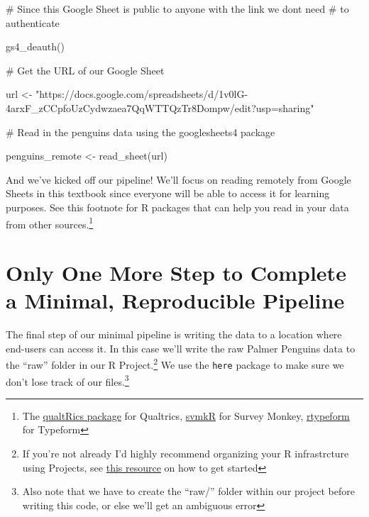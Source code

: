 \documentclass[
  letterpaper,
  DIV=11,
  numbers=noendperiod]{scrreprt}
\newenvironment{Shaded}{\begin{snugshade}}{\end{snugshade}}
\newcommand{\CommentTok}[1]{\textcolor[rgb]{0.37,0.37,0.37}{#1}}
\newcommand{\FunctionTok}[1]{\textcolor[rgb]{0.28,0.35,0.67}{#1}}
\newcommand{\NormalTok}[1]{\textcolor[rgb]{0.00,0.23,0.31}{#1}}
\newcommand{\OtherTok}[1]{\textcolor[rgb]{0.00,0.23,0.31}{#1}}
\newcommand{\StringTok}[1]{\textcolor[rgb]{0.13,0.47,0.30}{#1}}
\begin{document}
\begin{Shaded}
\begin{Highlighting}[]
\CommentTok{\# Since this Google Sheet is public to anyone with the link we don\textquotesingle{}t need}
\CommentTok{\# to authenticate}

\FunctionTok{gs4\_deauth}\NormalTok{()}

\CommentTok{\# Get the URL of our Google Sheet}

\NormalTok{url }\OtherTok{\textless{}{-}} \StringTok{"https://docs.google.com/spreadsheets/d/1v0lG{-}4arxF\_zCCpfoUzCydwzaea7QqWTTQzTr8Dompw/edit?usp=sharing"}

\CommentTok{\# Read in the penguins data using the googlesheets4 package}

\NormalTok{penguins\_remote }\OtherTok{\textless{}{-}} \FunctionTok{read\_sheet}\NormalTok{(url)}
\end{Highlighting}
\end{Shaded}

And we've kicked off our pipeline! We'll focus on reading remotely from
Google Sheets in this textbook since everyone will be able to access it
for learning purposes. See this footnote for R packages that can help
you read in your data from other sources.\footnote{The
  \href{https://docs.ropensci.org/qualtRics/}{qualtRics package} for
  Qualtrics,
  \href{http://soubhikbarari.com/svmkR/articles/svmkR.html}{svmkR} for
  Survey Monkey,
  \href{https://cran.r-project.org/web/packages/rtypeform/readme/README.html}{rtypeform}
  for Typeform}

\hypertarget{only-one-more-step-to-complete-a-minimal-reproducible-pipeline}{%
\section{Only One More Step to Complete a Minimal, Reproducible
Pipeline}\label{only-one-more-step-to-complete-a-minimal-reproducible-pipeline}}

The final step of our minimal pipeline is writing the data to a location
where end-users can access it. In this case we'll write the raw Palmer
Penguins data to the ``raw'' folder in our R Project.\footnote{If you're
  not already I'd highly recommend organizing your R infrastrcture using
  Projects, see
  \href{https://r4ds.hadley.nz/workflow-scripts.html\#projects}{this
  resource} on how to get started} We use the \texttt{here} package to
make sure we don't lose track of our files.\footnote{Also note that we
  have to create the ``raw/'' folder within our project before writing
  this code, or else we'll get an ambiguous error}
\end{document}
